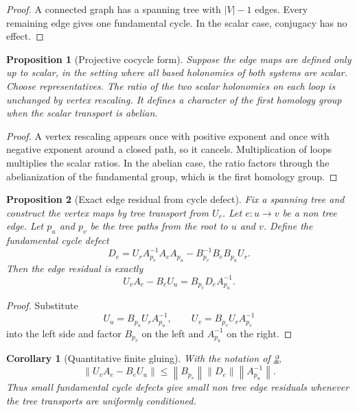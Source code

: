 \documentclass[11pt]{amsart}
\newtheorem{proposition}[proposition]{Proposition}
\newtheorem{corollary}[corollary]{Corollary}
\theoremstyle{definition}
\theoremstyle{remark}
\newcommand{\abs}[1]{\left\lvert#1\right\rvert}
\newcommand{\norm}[1]{\left\lVert#1\right\rVert}
\begin{document}
\begin{proof}
A connected graph has a spanning tree with \(\abs V-1\) edges. Every remaining edge gives one fundamental cycle. In the scalar case, conjugacy has no effect.
\end{proof}

\begin{proposition}[Projective cocycle form]\label{prop:projective_holonomy}
Suppose the edge maps are defined only up to scalar, in the setting where all based holonomies of both systems are scalar. Choose representatives. The ratio of the two scalar holonomies on each loop is unchanged by vertex rescaling. It defines a character of the first homology group when the scalar transport is abelian.
\end{proposition}

\begin{proof}
A vertex rescaling appears once with positive exponent and once with negative exponent around a closed path, so it cancels. Multiplication of loops multiplies the scalar ratios. In the abelian case, the ratio factors through the abelianization of the fundamental group, which is the first homology group.
\end{proof}


\begin{proposition}[Exact edge residual from cycle defect]\label{prop:holonomy_residual}
Fix a spanning tree and construct the vertex maps by tree transport from \(U_r\). Let \(e:u\to v\) be a non tree edge. Let \(p_u\) and \(p_v\) be the tree paths from the root to \(u\) and \(v\). Define the fundamental cycle defect
\[
D_e
=
U_rA_{p_v}^{-1}A_eA_{p_u}
-
B_{p_v}^{-1}B_eB_{p_u}U_r.
\]
Then the edge residual is exactly
\[
\boxed{
U_vA_e-B_eU_u
=
B_{p_v}D_eA_{p_u}^{-1}.
}
\]
\end{proposition}

\begin{proof}
Substitute
\[
U_u=B_{p_u}U_rA_{p_u}^{-1},
\qquad
U_v=B_{p_v}U_rA_{p_v}^{-1}
\]
into the left side and factor \(B_{p_v}\) on the left and \(A_{p_u}^{-1}\) on the right.
\end{proof}

\begin{corollary}[Quantitative finite gluing]\label{cor:quantitative_holonomy}
With the notation of \cref{prop:holonomy_residual},
\[
\norm{U_vA_e-B_eU_u}
\leq
\norm{B_{p_v}}\norm{D_e}\norm{A_{p_u}^{-1}}.
\]
Thus small fundamental cycle defects give small non tree edge residuals whenever the tree transports are uniformly conditioned.
\end{corollary}
\end{document}
